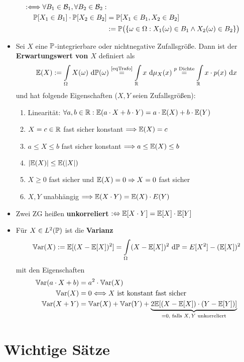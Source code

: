 \begin{itemize}
\begin{align*}
		:\Longleftrightarrow
		\forall B_1\in\B_1,\forall B_2\in\B_2:\\
		\P[X_1\in B_1]\cdot \P[X_2\in B_2]
		&=
		\P[X_1\in B_1, X_2\in B_2]\\
		&:=\P\big(\lbrace\omega\in\Omega:X_1(\omega)\in B_1\wedge X_2(\omega)\in B_2\rbrace\big)
	\end{align*}
	\item Sei $X$ eine $\P$-integrierbare oder nichtnegative Zufallsgröße. Dann ist der \textbf{Erwartungswert von $X$} definiert als
	\begin{align*}
		\E(X):=\int\limits_\Omega X(\omega)\d\P(\omega)
		\stackeq{\text{\ref{eqTrafo}}}
		\int\limits_\R x\d\mu_X (x)
		\stackeq{p\text{ Dichte}}
		\int\limits_\R x\cdot p(x)\d x
	\end{align*}
	und hat folgende Eigenschaften ($X,Y$ seien Zufallsgrößen):
	\begin{enumerate}
		\item Linearität: $\forall a,b\in\R:\E(a\cdot X+b\cdot Y)=a\cdot \E(X)+b\cdot\E(Y)$
		\item $X=c\in\R$ fast sicher konstant $\Longrightarrow\E(X)=c$
		\item $a\leq X\leq b$ fast sicher konstant $\Longrightarrow a\leq\E(X)\leq b$
		\item $|\E(X)|\leq\E(|X|)$
		\item $X\geq0$ fast sicher und $\E(X)=0\Rightarrow X=0$ fast sicher
		\item $X,Y$ unabhängig $\Longrightarrow\E(X\cdot Y)=\E(X)\cdot E(Y)$
	\end{enumerate}
	\item Zwei ZG heißen \textbf{unkorreliert} $:\gdw\E[X\cdot Y]=\E[X]\cdot\E[Y]$
	\item Für $X\in L^2(\P)$ ist die \textbf{Varianz} 
	\begin{align*}
		\Var(X):=\E[(X-\E[X])^2]=\int\limits_\Omega(X-\E[X])^2\d\P=E[X^2]-(\E[X])^2
	\end{align*}
	mit den Eigenschaften
	\begin{align*}
		\Var(a\cdot X+b)&=a^2\cdot\Var(X)\\
		\Var(X)&=0\Longleftrightarrow X\text{ ist konstant fast sicher}\\
		\Var(X+Y)&=\Var(X)+\Var(Y)+\underbrace{2\E[(X-\E[X])\cdot(Y-\E[Y])]}_{=0\text{, falls $X,Y$ unkorreliert}}
	\end{align*}
\end{itemize}

\section{Wichtige Sätze}

